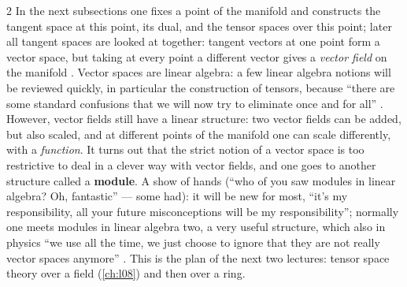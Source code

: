 \begin{paracol}{2}
In the next subsections one fixes a point of the manifold and constructs the tangent space at this point, its dual, and the tensor spaces over this point; later all tangent spaces are looked at together: tangent vectors at one point form a vector space, but taking at every point a different vector gives a
\emph{vector field} on the manifold . Vector spaces are linear algebra: a few linear algebra notions will be reviewed quickly, in particular the construction of tensors, because ``there are some standard confusions that we will now try to eliminate once and for all''
.
However, vector fields still have a linear structure: two vector fields can be added, but also scaled, and at different points of the manifold one can scale differently, with a \emph{function}. It turns out that the strict notion of a vector space is too restrictive to deal in a clever way with vector fields, and one goes to another
structure called a \textbf{module}. A show of hands (``who of you saw modules in linear algebra? Oh, fantastic'' --- some had): it will be new for most, ``it's my responsibility, all your future misconceptions will be my responsibility''; normally one meets modules in linear algebra two, a very useful structure, which also in physics
``we use all the time, we just choose to ignore that they are not really vector spaces anymore'' . This is the plan of the next two lectures: tensor space theory over a field (\cref{ch:l08}) and then over a ring.


\end{paracol}

